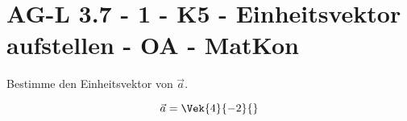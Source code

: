 \section{AG-L 3.7 - 1 - K5 - Einheitsvektor aufstellen - OA - MatKon}

\begin{beispiel}[AG-L 3.7]{1}
Bestimme den Einheitsvektor von $\vec{a}$.

$$\vec{a}=\Vek{4}{-2}{}$$


\end{beispiel}